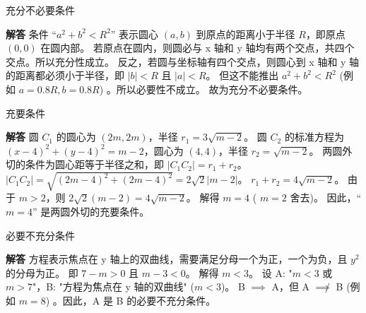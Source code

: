 \begin{solution}
    充分不必要条件

    \textbf{解答}
    条件 “$a^2+b^2 < R^2$” 表示圆心 $(a,b)$ 到原点的距离小于半径 $R$，即原点 $(0,0)$ 在圆内部。  若原点在圆内，则圆必与 x 轴和 y 轴均有两个交点，共四个交点。所以充分性成立。
    反之，若圆与坐标轴有四个交点，则圆心到 x 轴和 y 轴的距离都必须小于半径，即 $|b|<R$ 且 $|a|<R$。  但这不能推出 $a^2+b^2 < R^2$ (例如 $a=0.8R, b=0.8R$) 。所以必要性不成立。
    故为充分不必要条件。
\end{solution}

\begin{solution}
    充要条件

    \textbf{解答}
    圆 $C_1$ 的圆心为 $(2m, 2m)$，半径 $r_1=3\sqrt{m-2}$。
    圆 $C_2$ 的标准方程为 $(x-4)^2+(y-4)^2=m-2$，圆心为 $(4,4)$，半径 $r_2=\sqrt{m-2}$。
    两圆外切的条件为圆心距等于半径之和，即 $|C_1C_2| = r_1+r_2$。
    $|C_1C_2| = \sqrt{(2m-4)^2+(2m-4)^2} = 2\sqrt{2}|m-2|$。
    $r_1+r_2=4\sqrt{m-2}$。
    由于 $m>2$，则 $2\sqrt{2}(m-2) = 4\sqrt{m-2}$。  解得 $m=4$ ( $m=2$ 舍去)。
    因此，“$m=4$” 是两圆外切的充要条件。
\end{solution}

\begin{solution}
    必要不充分条件

    \textbf{解答}
    方程表示焦点在 y 轴上的双曲线，需要满足分母一个为正，一个为负，且 $y^2$ 的分母为正。
    即 $7-m>0$ 且 $m-3<0$。
    解得 $m<3$。
    设 A: "$m<3$ 或 $m>7$"，B: "方程为焦点在 y 轴的双曲线" ($m<3$)。
    B $\implies$ A，但 A $\not\implies$ B (例如 $m=8$) 。因此，A 是 B 的必要不充分条件。
\end{solution}